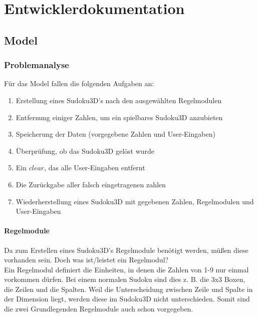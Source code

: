 \documentclass[a4paper,12pt]{scrreprt}
\begin{document}
	\chapter{Entwicklerdokumentation}
	\section{Model}
	\subsection{Problemanalyse}
	F\"ur das Model fallen die folgenden Aufgaben an:
	\begin{enumerate}
		\item Erstellung eines Sudoku3D's nach den ausgew\"ahlten Regelmodulen
		\item Entfernung einiger Zahlen, um ein spielbares Sudoku3D anzubieten
		\item Speicherung der Daten (vorgegebene Zahlen und User-Eingaben)
		\item \"Uberpr\"ufung, ob das Sudoku3D gel\"ost wurde
		\item Ein $clear$, das alle User-Eingaben entfernt
		\item Die Zur\"uckgabe aller falsch eingetragenen zahlen
		\item Wiederherstellung eines Sudoku3D mit gegebenen Zahlen, Regelmodulen und
			User-Eingaben
	\end{enumerate}

	\subsubsection{Regelmodule}
	Da zum Erstellen eines Sudoku3D's Regelmodule ben\"otigt werden, m\"u{\ss}en diese vorhanden
	sein. Doch was ist/leistet ein Regelmodul?\medskip \\
	Ein Regelmodul definiert die Einheiten, in denen die Zahlen von 1-9 nur einmal vorkommen d\"urfen.
	Bei einem normalen Sudoku sind dies z. B. die 3x3 Boxen, die Zeilen und die Spalten. Weil die
	Unterscheidung zwischen Zeile und Spalte in der Dimension liegt, werden diese im Sudoku3D nicht
	unterschieden. Somit sind die zwei Grundlegenden Regelmodule auch schon vorgegeben.
\end{document}
